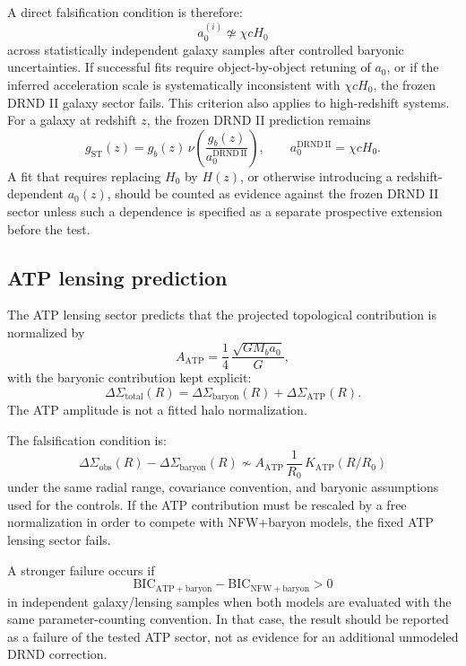 \documentclass[12pt]{iopart}
\begin{document}
A direct falsification condition is therefore:
\begin{equation}
a_0^{(i)}
\not\simeq
\chi cH_0
\end{equation}
across statistically independent galaxy samples after controlled baryonic uncertainties. If successful fits require object-by-object retuning of \(a_0\), or if the inferred acceleration scale is systematically inconsistent with \(\chi cH_0\), the frozen DRND II galaxy sector fails.
This criterion also applies to high-redshift systems. For a galaxy at redshift \(z\), the frozen DRND II prediction remains
\begin{equation}
g_{\mathrm{ST}}(z)
=
g_b(z)\,
\nu\!\left(\frac{g_b(z)}{a_0^{\mathrm{DRND\,II}}}\right),
\qquad
a_0^{\mathrm{DRND\,II}}=\chi cH_0.
\end{equation}
A fit that requires replacing \(H_0\) by \(H(z)\), or otherwise introducing a redshift-dependent \(a_0(z)\), should be counted as evidence against the frozen DRND II sector unless such a dependence is specified as a separate prospective extension before the test.

\subsection{ATP lensing prediction}

The ATP lensing sector predicts that the projected topological contribution is normalized by
\begin{equation}
A_{\mathrm{ATP}}
=
\frac14\,\frac{\sqrt{GM_ba_0}}{G},
\end{equation}
with the baryonic contribution kept explicit:
\begin{equation}
\Delta\Sigma_{\mathrm{total}}(R)
=
\Delta\Sigma_{\mathrm{baryon}}(R)
+
\Delta\Sigma_{\mathrm{ATP}}(R).
\end{equation}
The ATP amplitude is not a fitted halo normalization.

The falsification condition is:
\begin{equation}
\Delta\Sigma_{\mathrm{obs}}(R)
-
\Delta\Sigma_{\mathrm{baryon}}(R)
\not\sim
A_{\mathrm{ATP}}\,
\frac{1}{R_0}\,
K_{\mathrm{ATP}}(R/R_0)
\end{equation}
under the same radial range, covariance convention, and baryonic assumptions used for the controls. If the ATP contribution must be rescaled by a free normalization in order to compete with NFW+baryon models, the fixed ATP lensing sector fails.

A stronger failure occurs if
\begin{equation}
\mathrm{BIC}_{\mathrm{ATP+baryon}}
-
\mathrm{BIC}_{\mathrm{NFW+baryon}}
>
0
\end{equation}
in independent galaxy/lensing samples when both models are evaluated with the same parameter-counting convention. In that case, the result should be reported as a failure of the tested ATP sector, not as evidence for an additional unmodeled DRND correction.
\end{document}
